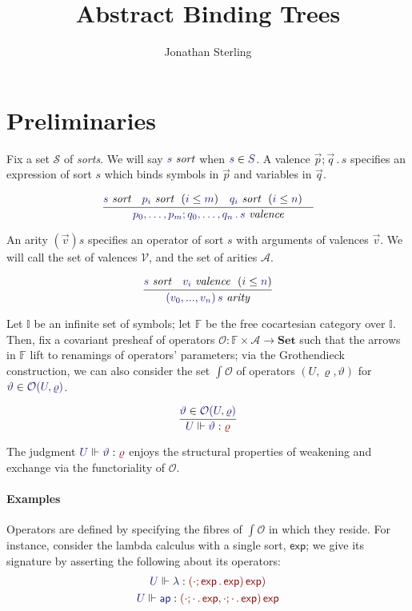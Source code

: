 \documentclass[11pt]{article}
\theoremstyle{definition}
\theoremstyle{remark}
\numberwithin{equation}{section}
\def\IModeColorName{MidnightBlue}
\def\OModeColorName{Maroon}
\newcommand\IMode[1]{{\color{\IModeColorName}{#1}}}
\newcommand\OMode[1]{{\color{\OModeColorName}{#1}}}
\newcommand\HypJ[2]{#1\ \ (#2)}
\newcommand\Member[2]{\IMode{#1}\in\IMode{#2}}
\newcommand\MkValence[3]{#1;#2\,.\, #3}
\newcommand\MkArity[2]{\left(#1\right) #2}
\newcommand\IsArity[1]{\IMode{#1}\ \textit{arity}}
\newcommand\IsValence[1]{\IMode{#1}\ \textit{valence}}
\newcommand\IsSort[1]{\IMode{#1}\ \textit{sort}}
\newcommand\Leq[2]{\IMode{#1}\leq\IMode{#2}}
\newcommand\Symbols{\mathbb{I}}
\newcommand\Finsets{\mathbb{F}}
\newcommand\Sorts{\mathcal{S}}
\newcommand\Valences{\mathcal{V}}
\newcommand\Arities{\mathcal{A}}
\newcommand\Operators{\mathcal{O}}
\newcommand\Sets{\mathbf{Set}}
\newcommand\IsOperator[3]{\IMode{#1}\Vdash \IMode{#2} : \OMode{#3}}
\newcommand\SortExp{\mathsf{exp}}
\begin{document}
\title{Abstract Binding Trees}
\date{}
\author{Jonathan Sterling}
\maketitle

\section{Preliminaries}

Fix a set $\Sorts$ of \emph{sorts}. We will say $\IsSort{s}$ when
$\Member{s}{S}$. A valence $\MkValence{\vec{p}}{\vec{q}}{s}$ specifies an
expression of sort $s$ which binds symbols in $\vec{p}$ and variables in
$\vec{q}$.

\[
  \infer{
    \IsValence{\MkValence{p_0,\dots,p_m}{q_0,\dots,q_n}{s}}
  }{
    \IsSort{s} &
    \HypJ{\IsSort{p_i}}{\Leq{i}{m}} &
    \HypJ{\IsSort{q_i}}{\Leq{i}{n}} &
  }
\]

An arity $\MkArity{\vec{v}}{s}$ specifies an operator of sort $s$ with
arguments of valences $\vec{v}$. We will call the set of valences $\Valences$,
and the set of arities $\Arities$.

\[
  \infer{
    \IsArity{\MkArity{v_0,...,v_n}{s}}
  }{
    \IsSort{s} &
    \HypJ{\IsValence{v_i}}{\Leq{i}{n}}
  }
\]


Let $\Symbols$ be an infinite set of symbols; let $\Finsets$ be the free
cocartesian category over $\Symbols$. Then, fix a covariant presheaf of operators
$\Operators:\Finsets\times\Arities\to\Sets$ such that the arrows in $\Finsets$
lift to renamings of operators' parameters; via the Grothendieck construction,
we can also consider the set $\int\Operators$ of operators
$(U,\varrho,\vartheta)$ for $\Member{\vartheta}{\Operators(U,\varrho)}$.

\[
  \infer{
    \IsOperator{U}{\vartheta}{\varrho}
  }{
    \Member{\vartheta}{\Operators(U,\varrho)}
  }
\]

The judgment $\IsOperator{U}{\vartheta}{\varrho}$ enjoys the structural
properties of weakening and exchange via the functoriality of
$\Operators$.

\paragraph{Examples}

Operators are defined by specifying the fibres of $\int\Operators$ in which
they reside. For instance, consider the lambda calculus with a single sort,
$\SortExp$; we give its signature by asserting the following about its
operators:
\begin{gather*}
  \IsOperator{U}{\lambda}{
    \MkArity{\MkValence{\cdot}{\SortExp}{\SortExp}}{\SortExp})
  }\\
  \IsOperator{U}{\mathsf{ap}}{
    \MkArity{
      \MkValence{\cdot}{\cdot}{\SortExp},
      \MkValence{\cdot}{\cdot}{\SortExp}
    }{\SortExp}
  }
\end{gather*}
\end{document}
